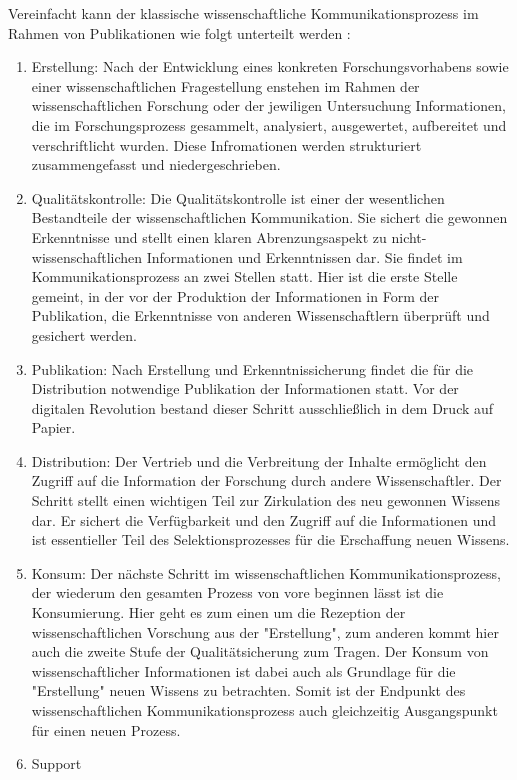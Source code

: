 Vereinfacht kann der klassische wissenschaftliche Kommunikationsprozess im Rahmen von Publikationen wie folgt unterteilt werden\cite{cite:11b} :
\begin{enumerate}
\item Erstellung: 
Nach der Entwicklung eines konkreten Forschungsvorhabens sowie einer wissenschaftlichen Fragestellung enstehen im Rahmen der wissenschaftlichen Forschung oder der jewiligen Untersuchung Informationen\cite{cite:11c}, die im Forschungsprozess gesammelt, analysiert, ausgewertet, aufbereitet und verschriftlicht wurden\cite{cite:11d}. Diese Infromationen werden strukturiert zusammengefasst und niedergeschrieben.\cite{cite:11d}
\item Qualitätskontrolle: 
Die Qualitätskontrolle ist einer der wesentlichen Bestandteile der wissenschaftlichen Kommunikation. Sie sichert die gewonnen Erkenntnisse\cite{cite:11e} und stellt einen klaren Abrenzungsaspekt zu nicht-wissenschaftlichen Informationen und Erkenntnissen dar\cite{cite:11f}. Sie findet im Kommunikationsprozess an zwei Stellen statt. Hier ist die erste Stelle gemeint, in der vor der Produktion der Informationen in Form der Publikation, die Erkenntnisse von anderen Wissenschaftlern überprüft und gesichert werden.\cite{cite:11g}
\item Publikation: 
Nach Erstellung und Erkenntnissicherung findet die für die Distribution notwendige Publikation der Informationen statt. Vor der digitalen Revolution bestand dieser Schritt ausschließlich in dem Druck auf Papier.\cite{cite:11h}
\item Distribution: 
Der Vertrieb und die Verbreitung der Inhalte ermöglicht den Zugriff auf die Information der Forschung durch andere Wissenschaftler. Der Schritt stellt einen wichtigen Teil zur Zirkulation des neu gewonnen Wissens dar\cite{cite:11i}. Er sichert die Verfügbarkeit und den Zugriff auf die Informationen und ist essentieller Teil des Selektionsprozesses für die Erschaffung neuen Wissens.\cite{cite:11l}
\item Konsum: 
Der nächste Schritt im wissenschaftlichen Kommunikationsprozess, der wiederum den gesamten Prozess von vore beginnen lässt ist die Konsumierung. Hier geht es zum einen um die Rezeption der wissenschaftlichen Vorschung aus der "Erstellung", zum anderen kommt hier auch die zweite Stufe der Qualitätsicherung zum Tragen.\cite{cite:11j} Der Konsum von wissenschaftlicher Informationen ist dabei auch als Grundlage für die "Erstellung" neuen Wissens zu betrachten. Somit ist der Endpunkt des wissenschaftlichen Kommunikationsprozess auch gleichzeitig Ausgangspunkt für einen neuen Prozess\cite{cite:11k}.
\item Support
\end{enumerate}
